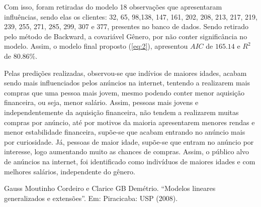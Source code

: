 \documentclass[a4paper]{article}
\begin{document}
Com isso, foram retiradas do modelo 18 observações que apresentaram influências, sendo elas os clientes: 32, 65, 98,138, 147, 161, 202, 208, 213, 217, 219, 239, 255, 271, 285, 299, 307 e 377, presentes no banco de dados. Sendo retirado pelo método de Backward, a covariável Gênero, por não conter significância no modelo. Assim, o modelo final proposto (\ref{eq:2}), apresentou $AIC$ de $165.14$ e $R^2$ de $80.86\%$. 

Pelas predições realizadas, observou-se que indívios de maiores idades, acabam sendo mais influenciados pelos anúncios na internet, tentendo a realizarem mais compras que uma pessoa mais jovem, mesmo podendo conter menor aquisição financeira, ou seja, menor salário. Assim, pessoas mais jovens e independentemente da aquisição financeira, não tendem a realizarem muitas compras por anúncio, até por motivos da maioria apresentarem menores rendas e menor estabilidade financeira, supõe-se que acabam entrando no anúncio mais por curiosidade. Já, pessoas de maior idade, supõe-se que entram no anúncio por interesse, logo aumentando muito as chances de compras. Assim, o público alvo de anúncios na internet, foi identificado como indivíduos de maiores idades e com melhores salários, independente do gênero.

\printbibliography 
Gauss Moutinho Cordeiro e Clarice GB Demétrio. “Modelos lineares generalizados e extensões”. Em:
Piracicaba: USP (2008).
\end{document}
